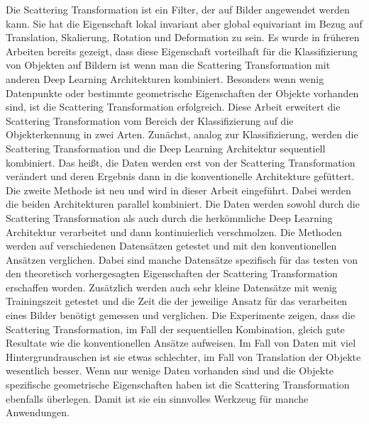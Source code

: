 Die Scattering Transformation ist ein Filter, der auf Bilder angewendet werden kann. Sie hat die Eigenschaft lokal invariant aber global equivariant im Bezug auf Translation, Skalierung, Rotation und Deformation zu sein. Es wurde in früheren Arbeiten bereits gezeigt, dass diese Eigenschaft vorteilhaft für die Klassifizierung von Objekten auf Bildern ist wenn man die Scattering Transformation mit anderen Deep Learning Architekturen kombiniert. Besonders wenn wenig Datenpunkte oder bestimmte geometrische Eigenschaften der Objekte vorhanden sind, ist die Scattering Transformation erfolgreich. Diese Arbeit erweitert die Scattering Transformation vom Bereich der Klassifizierung auf die Objekterkennung in zwei Arten. Zunächst, analog zur Klassifizierung, werden die Scattering Transformation und die Deep Learning Architektur sequentiell kombiniert. Das heißt, die Daten werden erst von der Scattering Transformation verändert und deren Ergebnis dann in die konventionelle Architekture gefüttert. Die zweite Methode ist neu und wird in dieser Arbeit eingeführt. Dabei werden die beiden Architekturen parallel kombiniert. Die Daten werden sowohl durch die Scattering Transformation als auch durch die herkömmliche Deep Learning Architektur verarbeitet und dann kontinuierlich verschmolzen. Die Methoden werden auf verschiedenen Datensätzen getestet und mit den konventionellen Ansätzen verglichen. Dabei sind manche Datensätze spezifisch für das testen von den theoretisch vorhergesagten Eigenschaften der Scattering Transformation erschaffen worden. Zusätzlich werden auch sehr kleine Datensätze mit wenig Trainingszeit getestet und die Zeit die der jeweilige Ansatz für das verarbeiten eines Bilder benötigt gemessen und verglichen. Die Experimente zeigen, dass die Scattering Transformation, im Fall der sequentiellen Kombination, gleich gute Resultate wie die konventionellen Ansätze aufweisen. Im Fall von Daten mit viel Hintergrundrauschen ist sie etwas schlechter, im Fall von Translation der Objekte wesentlich besser. Wenn nur wenige Daten vorhanden sind und die Objekte spezifische geometrische Eigenschaften haben ist die Scattering Transformation ebenfalls überlegen. Damit ist sie ein sinnvolles Werkzeug für manche Anwendungen. 